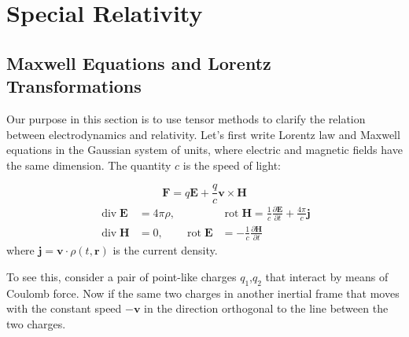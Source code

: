 \chapter{Special Relativity}
\section{Maxwell Equations and Lorentz Transformations}
Our purpose in this section is to use tensor methods to clarify the relation between electrodynamics and relativity. Let's first write Lorentz law and Maxwell equations in the Gaussian system of units, where electric and magnetic fields have the same dimension. The quantity $c$ is the speed of light:
\begin{qt}
    \begin{equation}
\mathbf{F}=q \mathbf{E}+\frac{q}{c} \mathbf{v} \times \mathbf{H}
\end{equation}
\begin{equation}
\begin{aligned}
\operatorname{div} \mathbf{E} &=4 \pi \rho, & & \operatorname{rot} \mathbf{H}=\frac{1}{c} \frac{\partial \mathbf{E}}{\partial t}+\frac{4 \pi}{c} \mathbf{j} \\
\operatorname{div} \mathbf{H} &=0, & \operatorname{rot} \mathbf{E} &=-\frac{1}{c} \frac{\partial \mathbf{H}}{\partial t}
\end{aligned}
\end{equation}
where $\mathbf{j}=\mathbf{v} \cdot \rho(t, \mathbf{r})$ is the current density.
\end{qt}
 To see this, consider a pair of point-like charges $q_1$,$q_2$ that interact by means of Coulomb force. Now if the same two charges in another inertial frame that moves with the constant speed $-\mathbf{v}$ in the direction orthogonal to the line between the two charges.

